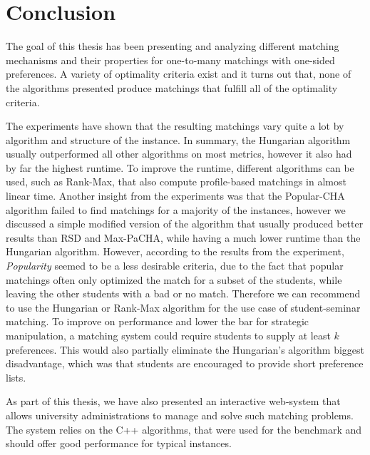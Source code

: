 \section{Conclusion}

The goal of this thesis has been presenting and analyzing different matching mechanisms and their properties for one-to-many matchings with one-sided preferences. A variety of optimality criteria exist and it turns out that, none of the algorithms presented produce matchings that fulfill all of the optimality criteria. 

The experiments have shown that the resulting matchings vary quite a lot by algorithm and structure of the instance. In summary, the Hungarian algorithm usually outperformed all other algorithms on most metrics, however it also had by far the highest runtime. To improve the runtime, different algorithms can be used, such as Rank-Max, that also compute profile-based matchings in almost linear time. Another insight from the experiments was that the Popular-CHA algorithm failed to find matchings for a majority of the instances, however we discussed a simple modified version of the algorithm that usually produced better results than RSD and Max-PaCHA, while having a much lower runtime than the Hungarian algorithm. However, according to the results from the experiment, \emph{Popularity} seemed to be a less desirable criteria, due to the fact that popular matchings often only optimized the match for a subset of the students, while leaving the other students with a bad or no match. Therefore we can recommend to use the Hungarian or Rank-Max algorithm for the use case of student-seminar matching. To improve on performance and lower the bar for strategic manipulation, a matching system could require students to supply at least $k$ preferences. This would also partially eliminate the Hungarian's algorithm biggest disadvantage, which was that students are encouraged to provide short preference lists.

As part of this thesis, we have also presented an interactive web-system that allows university administrations to manage and solve such matching problems. The system relies on the C++ algorithms, that were used for the benchmark and should offer good performance for typical instances.  